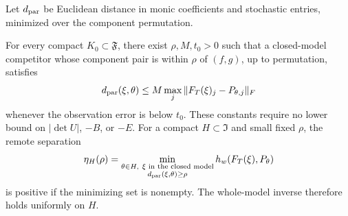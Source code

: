 Let $d_{\rm par}$ be Euclidean distance in monic coefficients and
stochastic entries, minimized over the component permutation.

\begin{lemma}\label{lem:local-cubic}
For every compact $K_0\subset\mathfrak F$, there exist $\rho,M,t_0>0$
such that a closed-model competitor whose component pair is within
$\rho$ of $(f,g)$, up to permutation, satisfies
\begin{equation}\label{eq:local-inverse}
 d_{\rm par}(\xi,\theta)\le M\max_j\|F_T(\xi)_j-P_{\theta,j}\|_F
\end{equation}
whenever the observation error is below $t_0$. These constants require
no lower bound on $|\det U|$, $-B$, or $-E$.
For a compact $H\subset\mathfrak I$ and small fixed $\rho$, the remote
separation
\begin{equation}\label{eq:separation}
 \eta_H(\rho)=\min_{\substack{\theta\in H,\ \xi\text{ in the closed model}\\
                         d_{\rm par}(\xi,\theta)\ge\rho}}
                   h_w(F_T(\xi),P_\theta)
\end{equation}
is positive if the minimizing set is nonempty. The whole-model inverse
therefore holds uniformly on $H$.
\end{lemma}
